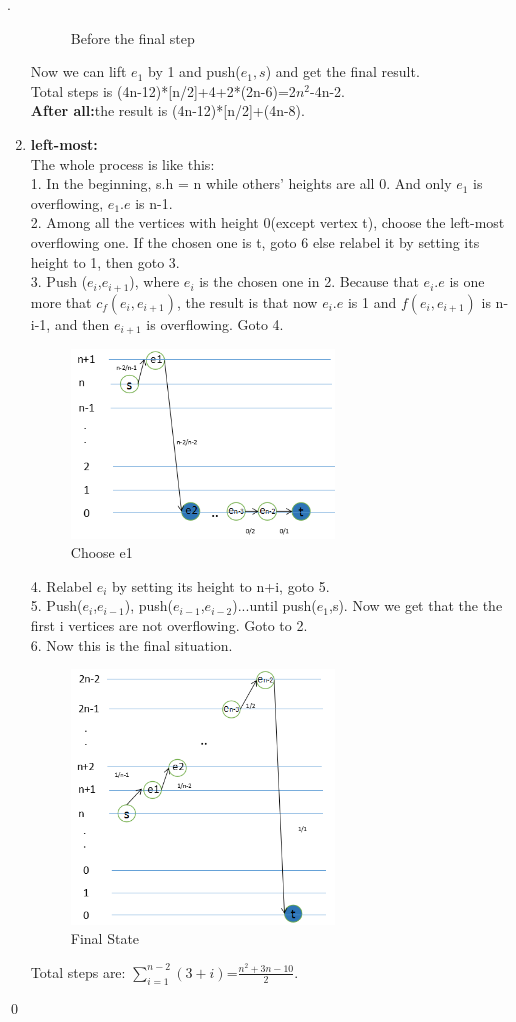 \documentclass[12pt, notitlepage]{article}
\newenvironment{sol}
  {\par\vspace{3mm}\noindent{\it Solution}.}{\qed}
\begin{document}
\begin{sol}
\begin{enumerate}
\begin{figure}[H]
	\caption{Before the final step}
	\end{figure}
Now we can lift $e_1$ by 1 and push($e_1,s$) and get the final result.\\
Total steps is  (4n-12)*[n/2]+4+2*(2n-6)=2$n^2$-4n-2.\\
\textbf{After all:}the result is (4n-12)*[n/2]+(4n-8).
\item\textbf{left-most:}\\
The whole process is like this:\\
1. In the beginning, s.h = n while others' heights are all 0. And only $e_1$ is overflowing, $e_1.e$ is n-1.\\
2. Among all the vertices with height 0(except vertex t), choose the left-most overflowing one. If the chosen one is t, goto 6 else relabel it by setting its height to 1, then goto 3.\\
3. Push ($e_i$,$e_{i+1}$), where $e_i$ is the chosen one in 2. Because that $e_i.e$ is one more that $c_f(e_i,e_{i+1})$, the result is that now $e_i.e$ is 1 and $f(e_i,e_{i+1})$ is n-i-1, and then $e_{i+1}$ is overflowing. Goto 4.\\
	\begin{figure}[H]\centering
	\includegraphics[width=7cm]{8.png}
	\caption{Choose e1}
	\end{figure}
4. Relabel $e_i$ by setting its height to n+i, goto 5.\\
5. Push($e_i$,$e_{i-1}$), push($e_{i-1}$,$e_{i-2}$)...until push($e_1$,s). Now we get that the the first i vertices are not overflowing. Goto to 2.\\
6. Now this is the final situation.\\
	\begin{figure}[H]\centering
	\includegraphics[width=7cm]{9.png}
	\caption{Final State}
	\end{figure}
Total steps are: $\sum_{i=1}^{n-2}(3+i)$=$\frac{n^2+3n-10}{2}$.
\end{enumerate}
\end{sol}
\end{document}
